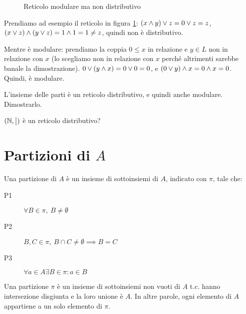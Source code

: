 \begin{figure}[ht]
\centering
{}
\caption{\label{fig:mod_not_distr}Reticolo modulare ma non distributivo}
\end{figure}
Prendiamo ad esempio il reticolo in figura \ref{fig:mod_not_distr}: $(x \wedge y) \vee z = 0 \vee z = z$, $(x \vee z) \wedge (y \vee z) = 1 \wedge 1 = 1 \neq z$, quindi non \`e distributivo. 

Mentre \`e modulare: prendiamo la coppia $0 \le x$ in relazione e $y \in L$ non in relazione con $x$ (lo scegliamo non in relazione con $x$ perch\'e altrimenti sarebbe banale la dimostrazione). $ 0 \vee (y \wedge x) = 0 \vee 0 = 0$, e $(0 \vee y) \wedge x = 0 \wedge x = 0$. Quindi, \`e modulare.

\begin{esercizio}
L'insieme delle parti \`e un reticolo distributivo, e quindi anche modulare. Dimostrarlo.
\end{esercizio}

\begin{esercizio}
$(\mathbb{N}, \bigm|)$ \`e un reticolo distributivo?
\end{esercizio}


\section{Partizioni di $A$}

\begin{defn}[Partizione]\label{partizione}
Una partizione di $A$ \`e un insieme di sottoinsiemi di $A$, indicato con $\pi$, tale che:
\begin{description}
  \item[P1\label{itm:P1}] $\forall B \in \pi , \ B \neq \emptyset$
  \item[P2\label{itm:P2}] $B, C \in \pi , \ B \cap C \neq \emptyset \implies B = C$
  \item[P3\label{itm:P3}] $\forall a \in A \exists B \in \pi : a \in B$
\end{description}
\end{defn}
Una partizione $\pi$ \`e un insieme di sottoinsiemi non vuoti di $A$ t.c. hanno intersezione disgiunta e la loro unione \`e $A$. In altre parole, ogni elemento di $A$ appartiene a un solo elemento di $\pi$.

